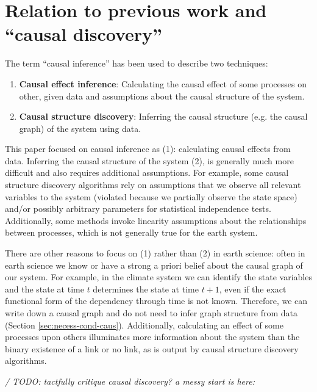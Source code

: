 \documentclass[12pt]{article}
\begin{document}
\section{Relation to previous work and ``causal discovery''}
\label{sec:discovery}

The term ``causal inference'' has been used to describe two
techniques:

\begin{enumerate}
\item \textbf{Causal effect inference}: Calculating the causal effect
  of some processes on other, given data and assumptions about the
  causal structure of the system.
\item \textbf{Causal structure discovery}: Inferring the causal
  structure (e.g. the causal graph) of the system using data.
\end{enumerate}

This paper focused on causal inference as (1): calculating causal
effects from data. Inferring the causal structure of the system (2),
is generally much more difficult and also requires additional
assumptions. For example, some causal structure discovery algorithms
rely on assumptions that we observe all relevant variables to the
system (violated because we partially observe the state space) and/or
possibly arbitrary parameters for statistical independence
tests. Additionally, some methods invoke linearity assumptions about
the relationships between processes, which is not generally true for
the earth system.

There are other reasons to focus on (1) rather than (2) in
earth science: often in earth science we know or have a strong a
priori belief about the causal graph of our system. For example, in
the climate system we can identify the state variables and the state
at time \(t\) determines the state at time \(t+1\), even if the exact
functional form of the dependency through time is not
known. Therefore, we can write down a causal graph and do not need to
infer graph structure from data (Section
\ref{sec:necess-cond-caus}). Additionally, calculating an effect of
some processes upon others illuminates more information about the
system than the binary existence of a link or no link, as is output
by causal structure discovery algorithms.

\textit{/ TODO: tactfully critique causal discovery? a messy start is
  here:}
\end{document}
